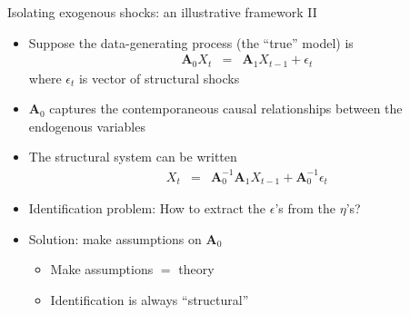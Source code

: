\documentclass[9pt,xcolor={dvipsnames}]{beamer}
\newcommand{\bit}{\begin{itemize}}
\newcommand{\eit}{\end{itemize}}
\newcommand{\bc}{\color{blue}}
\begin{document}
\begin{frame}{Isolating exogenous shocks: an illustrative framework II}

\bit
\setlength\itemsep{1.5em} 

\item Suppose the data-generating process (the ``true'' model) is
\begin{eqnarray}
\mathbf{A}_0 X_t &=& \mathbf{A}_1 X_{t-1} + \epsilon_{t}    \nonumber 
\end{eqnarray}
where $\epsilon_t$ is vector of {\bc structural shocks}

\item $\mathbf{A}_0$ captures the contemporaneous causal relationships between the endogenous variables 

\item The structural system can be written
\begin{eqnarray}
X_t &=& \mathbf{A}_0^{-1} \mathbf{A}_1 X_{t-1} + \mathbf{A}_0^{-1}\epsilon_{t}    \nonumber 
\end{eqnarray}

\item Identification problem: How to extract the $\epsilon$'s from the $\eta$'s?

\item Solution: make assumptions on $\mathbf{A}_0$
\bit
	\item Make assumptions $=$ theory
	
	\item Identification is always ``structural''
\eit

\eit

\end{frame}
\end{document}
